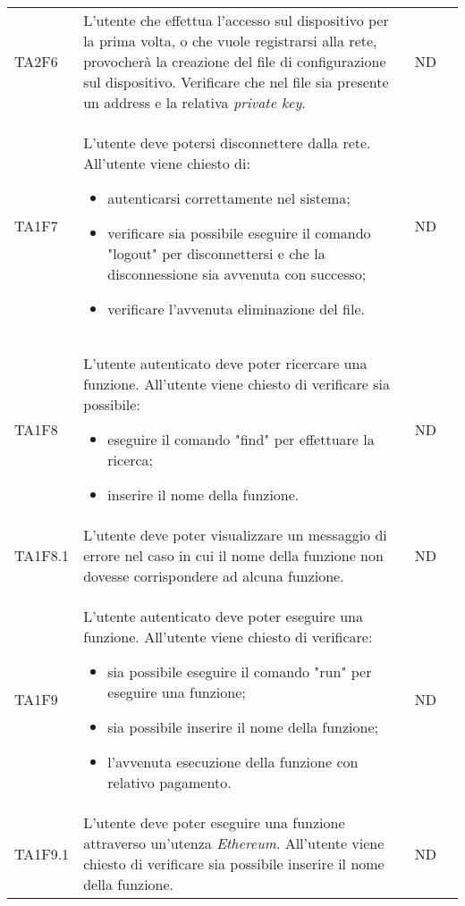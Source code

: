 \begin{longtable}{|C{1.5cm}|C{8cm}|C{3cm}|C{1cm}|}
	TA2F6 &
	L'utente che effettua l'accesso sul dispositivo per la prima volta, o che vuole registrarsi alla rete, provocherà la creazione del file di configurazione sul dispositivo. Verificare che nel file sia presente un address e la relativa \textit{private key\glo}. &
	ND \\

	TA1F7  &
	L’utente deve potersi disconnettere dalla rete. All’utente viene chiesto di:
	\begin{itemize}
		\item autenticarsi correttamente nel sistema;
		\item verificare sia possibile eseguire il comando "logout" per disconnettersi e che la disconnessione sia avvenuta con successo;
		\item verificare l'avvenuta eliminazione del file.
	\end{itemize} &
	ND \\[-5ex]

	TA1F8  &
	L’utente autenticato deve poter ricercare una funzione. All’utente viene chiesto di verificare sia possibile:
	\begin{itemize}
		\item eseguire il comando "find" per effettuare la ricerca;
		\item inserire il nome della funzione.
	\end{itemize} &
	ND \\[-5ex]

	TA1F8.1  &
	L’utente deve poter visualizzare un messaggio di errore nel caso in cui il nome della funzione non dovesse corrispondere ad alcuna funzione. &
	ND \\

	TA1F9  &
	L’utente autenticato deve poter eseguire una funzione. All’utente viene chiesto di verificare:
	\begin{itemize}
		\item sia possibile eseguire il comando "run" per eseguire una funzione;
		\item sia possibile inserire il nome della funzione;
		\item l'avvenuta esecuzione della funzione con relativo pagamento.
	\end{itemize} &
	ND \\[-5ex]

	TA1F9.1  &
	L’utente deve poter eseguire una funzione attraverso un'utenza \textit{Ethereum\glos}. All’utente viene chiesto di verificare sia possibile inserire il nome della funzione. &
	ND \\


\end{longtable}
